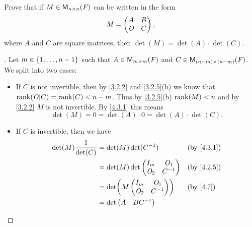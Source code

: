 \begin{ex}\label{ex:4.3.21}
  Prove that if \(M \in \mathsf{M}_{{n} \times n}({\mathit{F}})\) can be written in the form
  \[
    M = \begin{pmatrix}
      A   & B \\
      \mathit{O} & C
    \end{pmatrix},
  \]
  where \(A\) and \(C\) are square matrices, then \(\det(M) = \det(A) \cdot \det(C)\).
\end{ex}

\begin{proof}[]
  Let \(m \in \left\lbrace1, \dots, n - 1\right\rbrace\) such that \(A \in \mathsf{M}_{{m} \times m}({\mathit{F}})\) and \(C \in \mathsf{M}_{{(n - m)} \times (n - m)}({\mathit{F}})\).
  We split into two cases:
  \begin{itemize}
    \item If \(C\) is not invertible, then by \cref{3.2.2} and \cref{3.2.5}(b) we know that \(\rk{\zm | C} = \rk{C} < n - m\).
          Thus by \cref{3.2.5}(b) \(\rk{M} < n\) and by \cref{3.2.2} \(M\) is not invertible.
          By \cref{4.3.1} this means
          \[
            \det(M) = 0 = \det(A) \cdot 0 = \det(A) \cdot \det(C).
          \]
    \item If \(C\) is invertible, then we have
          \begin{align*}
            \det(M) \frac{1}{\det(C)} & = \det(M) \det(C^{-1})        &  & \text{(by \cref{4.3.1})}     \\
                                      & = \det(M) \det\begin{pmatrix}
                                                        I_m   & \zm_1  \\
                                                        \zm_2 & C^{-1}
                                                      \end{pmatrix} &  & \text{(by \cref{4.2.5})}       \\
                                      & = \det\pa{M \begin{pmatrix}
                                                        I_m   & \zm_1  \\
                                                        \zm_2 & C^{-1}
                                                      \end{pmatrix}}   &  & \text{(by \cref{4.7})}        \\
                                      & = \det\begin{pmatrix}
                                                A   & BC^{-1} \\

\end{pmatrix}
\end{align*}
\end{itemize}
\end{proof}
